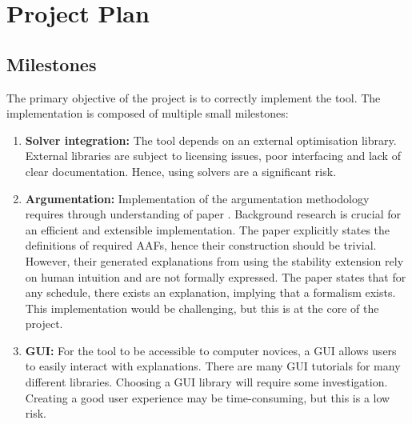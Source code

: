 \chapter{Project Plan}

\section{Milestones}

The primary objective of the project is to correctly implement the tool. The implementation is composed of multiple small milestones:

\begin{enumerate}
	\item\textbf{Solver integration:} The tool depends on an external optimisation library. External libraries are subject to licensing issues, poor interfacing and lack of clear documentation. Hence, using solvers are a significant risk.
	\item\textbf{Argumentation:} Implementation of the argumentation methodology requires through understanding of paper \cite{aes}. Background research is crucial for an efficient and extensible implementation. The paper explicitly states the definitions of required AAFs, hence their construction should be trivial. However, their generated explanations from using the stability extension rely on human intuition and are not formally expressed. The paper states that for any schedule, there exists an explanation, implying that a formalism exists. This implementation would be challenging, but this is at the core of the project.
	\item\textbf{GUI:} For the tool to be accessible to computer novices, a GUI allows users to easily interact with explanations. There are many GUI tutorials for many different libraries. Choosing a GUI library will require some investigation. Creating a good user experience may be time-consuming, but this is a low risk.
\end{enumerate}

